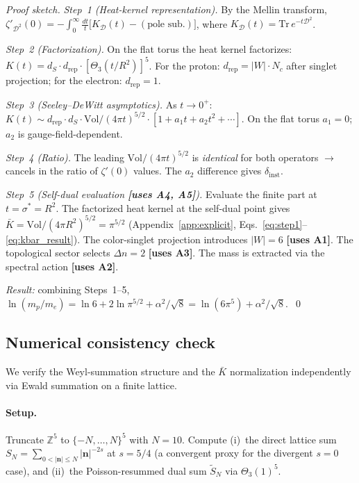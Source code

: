 \begin{proof}[Proof sketch]
\emph{Step~1 (Heat-kernel representation).}
By the Mellin transform,
$\zeta'_{\mathcal{D}^2}(0) = -\int_0^\infty\frac{dt}{t}
\bigl[K_{\mathcal{D}}(t)-(\text{pole sub.})\bigr]$,
where $K_{\mathcal{D}}(t)=\mathrm{Tr}\,e^{-t\mathcal{D}^2}$.

\emph{Step~2 (Factorization).}
On the flat torus the heat kernel factorizes:
$K(t) = d_S\cdot d_{\mathrm{rep}}\cdot[\Theta_3(t/R^2)]^5$.
For the proton: $d_{\mathrm{rep}}=|W|\cdot N_c$ after singlet
projection; for the electron: $d_{\mathrm{rep}}=1$.

\emph{Step~3 (Seeley--DeWitt asymptotics).}
As $t\to 0^+$:
$K(t)\sim d_{\mathrm{rep}}\cdot d_S\cdot
\mathrm{Vol}/(4\pi t)^{5/2}\cdot[1+a_1 t+a_2 t^2+\cdots]$.
On the flat torus $a_1=0$; $a_2$ is gauge-field-dependent.

\emph{Step~4 (Ratio).}
The leading $\mathrm{Vol}/(4\pi t)^{5/2}$ is \emph{identical} for
both operators $\to$ cancels in the ratio of $\zeta'(0)$ values.
The $a_2$ difference gives $\delta_{\mathrm{inst}}$.

\emph{Step~5 (Self-dual evaluation \textbf{[uses A4, A5]}).}
Evaluate the finite part at $t=\sigma^*=R^2$.  The factorized heat
kernel at the self-dual point gives
$\bar K = \mathrm{Vol}/(4\pi R^2)^{5/2}=\pi^{5/2}$
(Appendix~\ref{app:explicit}, Eqs.~\eqref{eq:step1}--\eqref{eq:kbar_result}).
The color-singlet projection introduces $|W|=6$ \textbf{[uses A1]}.
The topological sector selects $\Delta n=2$ \textbf{[uses A3]}.
The mass is extracted via the spectral action \textbf{[uses A2]}.

\emph{Result:} combining Steps~1--5,
$\ln(m_p/m_e)=\ln 6 + 2\ln\pi^{5/2}+\alpha^2/\!\sqrt{8}
=\ln(6\pi^5)+\alpha^2/\!\sqrt{8}$.~\qed
\end{proof}

\subsection{Numerical consistency check}
\label{sec:Z16_numerical}

We verify the Weyl-summation structure and the $\bar K$ normalization
independently via Ewald summation on a finite lattice.

\paragraph{Setup.}
Truncate $\mathbb{Z}^5$ to $\{-N,\ldots,N\}^5$ with $N=10$.
Compute (i)~the direct lattice sum
$S_N = \sum_{0<|\mathbf{n}|\leq N} |\mathbf{n}|^{-2s}$ at $s=5/4$
(a convergent proxy for the divergent $s=0$ case), and
(ii)~the Poisson-resummed dual sum $\tilde S_N$
via $\Theta_3(1)^5$.

